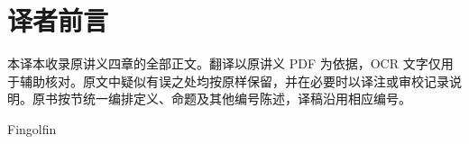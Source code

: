\documentclass[BookTitleCN={有限群及其表示},OriginalAuthor={Jean-François Dat},OriginalYear={2009-2010},Translator={Fingolfin},TranslationDate={2026年10月24日},ModelUsed={ZCode},BibStyle=numeric]{mathtranslation}
\begin{document}
\hypersetup{pageanchor=false}
\makecover
\cleardoublepage
\hypersetup{pageanchor=true}
\frontmatter
\chapter*{译者前言}
本译本收录原讲义四章的全部正文。翻译以原讲义 PDF 为依据，OCR 文字仅用于辅助核对。原文中疑似有误之处均按原样保留，并在必要时以译注或审校记录说明。原书按节统一编排定义、命题及其他编号陈述，译稿沿用相应编号。
\par\medskip\hfill Fingolfin
\makecontents
\mainmatter












\backmatter
\printterminology
\end{document}
